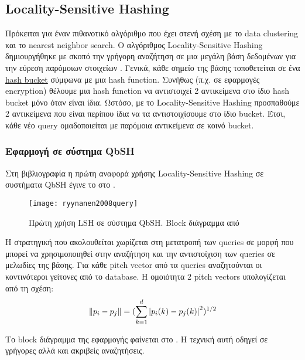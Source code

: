 \newcommand*{\ls}{Locality-Sensitive}%
\newcommand*{\lsh}{Locality-Sensitive Hashing}%
\subsection{\lsh{}}\label{sub:lsh}
Πρόκειται για έναν πιθανοτικό αλγόριθμο που έχει στενή σχέση με το data clustering και το nearest neighbor search.
O αλγόριθμος \lsh{} δημιουργήθηκε με σκοπό την γρήγορη αναζήτηση σε μια μεγάλη βάση δεδομένων για την εύρεση παρόμοιων στοιχείων \cite{slaney2008locality}.
Γενικά, κάθε σημείο της βάσης τοποθετείται σε ένα \href{https://en.wikipedia.org/wiki/Hash_table}{hash bucket} σύμφωνα με μια hash function.
Συνήθως (π.χ. σε εφαρμογές encryption) θέλουμε μια hash function να αντιστοιχεί 2 αντικείμενα στο ίδιο hash bucket μόνο όταν είναι ίδια.
Ωστόσο, με το \lsh{} προσπαθούμε 2 αντικείμενα που είναι περίπου ίδια να τα αντιστοιχίσουμε στο ίδιο bucket.
Έτσι, κάθε νέο query ομαδοποιείται με παρόμοια αντικείμενα σε κοινό bucket.

\subsubsection{Εφαρμογή σε σύστημα QbSH}
Στη βιβλιογραφία η πρώτη αναφορά χρήσης \lsh{} σε συστήματα QbSH έγινε το \citeyear{ryynanen2008query} στο \cite{ryynanen2008query}.

\begin{wrapfigure}{r}{0.5\textwidth}
	\centering
	\vspace{-20pt}\texttt{[image: ryynanen2008query]}
	\vspace{-20pt}\caption{Πρώτη χρήση LSH σε σύστημα QbSH. Block διάγραμμα από \protect\cite{ryynanen2008query}}
	\label{fig:ryynanen2008query}
\end{wrapfigure}

Η στρατηγική που ακολουθείται χωρίζεται στη
μετατροπή των queries σε μορφή που μπορεί να χρησιμοποιηθεί στην αναζήτηση και
την αντιστοίχιση των queries σε μελωδίες της βάσης.
Για κάθε pitch vector από τα queries αναζητούνται οι κοντινότεροι γείτονες από το database.
Η ομοιότητα 2 pitch vectors υπολογίζεται από τη σχέση:
\begin{equation*}
	\left\lVert p_i - p_j\right\rVert = (\sum\limits_{k=1}^{d}\left\lvert p_i(k) - p_j(k)\right\rvert^2)^{1/2}
\end{equation*}

Το block διάγραμμα της εφαρμογής φαίνεται στο .
Η τεχνική αυτή οδηγεί σε γρήγορες αλλά και ακριβείς αναζητήσεις.

